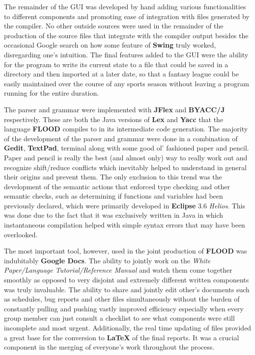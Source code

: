 \documentclass[12pt]{report}
\begin{document}
The remainder of the GUI was developed by hand adding various functionalities to different components and promoting ease of integration with files generated by the compiler. No other outside sources were used in the remainder of the production of the source files that integrate with the compiler output besides the occasional Google search on how some feature of \textbf{Swing} truly worked, disregarding one's intuition. The final features added to the GUI were the ability for the program to write its current state to a file that could be saved in a directory and then imported at a later date, so that a fantasy league could be easily maintained over the course of any sports season without leaving a program running for the entire duration.

The parser and grammar were implemented with \textbf{JFlex} and \textbf{BYACC/J} respectively. These are both the Java versions of \textbf{Lex} and \textbf{Yacc} that the language \textbf{FLOOD} compiles to in its intermediate code generation. The majority of the development of the parser and grammar were done in a combination of \textbf{Gedit}, \textbf{TextPad}, terminal along with some good ol' fashioned paper and pencil. Paper and pencil is really the best (and almost only) way to really work out and recognize shift/reduce conflicts which inevitably helped to understand in general their origins and prevent them. The only exclusion to this trend was the development of the semantic actions that enforced type checking and other semantic checks, such as determining if functions and variables had been previously declared, which were primarily developed in \textbf{Eclipse} 3.6 \textit{Helios}. This was done due to the fact that it was exclusively written in Java in which instantaneous compilation helped with simple syntax errors that may have been overlooked.

The most important tool, however, used in the joint production of \textbf{FLOOD} was indubitably \textbf{Google Docs}. The ability to jointly work on the \textit{White Paper/Language Tutorial/Reference Manual} and watch them come together smoothly as opposed to very disjoint and extremely different written components was truly invaluable. The ability to share and jointly edit other's documents such as schedules, bug reports and other files simultaneously without the burden of constantly pulling and pushing vastly improved efficiency especially when every group member can just consult a checklist to see what components were still incomplete and most urgent. Additionally, the real time updating of files provided a great base for the conversion to \textbf{\LaTeX} of the final reports. It was a crucial component in the merging of everyone's work throughout the process.
\end{document}
